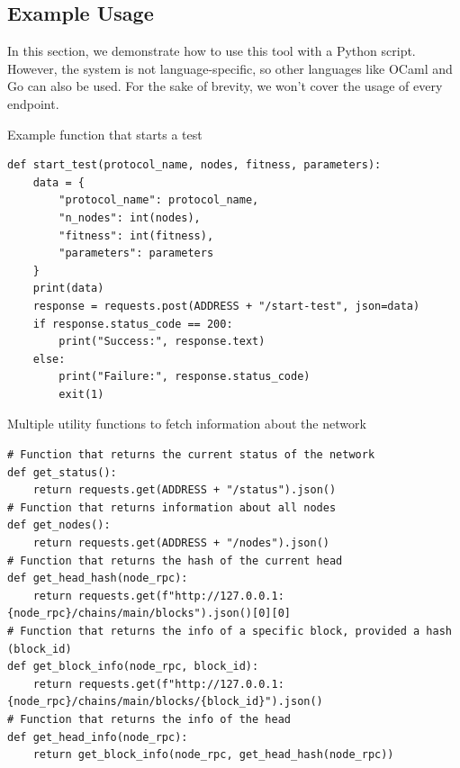 \subsection*{Example Usage}

In this section, we demonstrate how to use this tool with a Python script. However, the system is not language-specific, so other languages like OCaml and Go can also be used. For the sake of brevity, we won't cover the usage of every endpoint.

\begin{listing}[H]
\caption{Example function that starts a test}
\label{lst:python_code}
\begin{verbatim}
def start_test(protocol_name, nodes, fitness, parameters):
    data = {
        "protocol_name": protocol_name,
        "n_nodes": int(nodes),
        "fitness": int(fitness),
        "parameters": parameters
    }
    print(data)
    response = requests.post(ADDRESS + "/start-test", json=data)
    if response.status_code == 200:
        print("Success:", response.text)
    else:
        print("Failure:", response.status_code)
        exit(1)
\end{verbatim}
\end{listing}

\begin{listing}[H]
\caption{Multiple utility functions to fetch information about the network}
\label{lst:python_code}
\begin{verbatim}
# Function that returns the current status of the network
def get_status():
    return requests.get(ADDRESS + "/status").json()
# Function that returns information about all nodes
def get_nodes():
    return requests.get(ADDRESS + "/nodes").json()
# Function that returns the hash of the current head
def get_head_hash(node_rpc):
    return requests.get(f"http://127.0.0.1:{node_rpc}/chains/main/blocks").json()[0][0]
# Function that returns the info of a specific block, provided a hash (block_id)
def get_block_info(node_rpc, block_id):
    return requests.get(f"http://127.0.0.1:{node_rpc}/chains/main/blocks/{block_id}").json()
# Function that returns the info of the head
def get_head_info(node_rpc):
    return get_block_info(node_rpc, get_head_hash(node_rpc))
\end{verbatim}
\end{listing}




